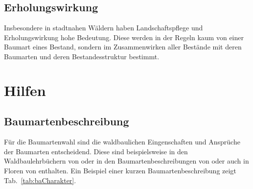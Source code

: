 \documentclass[twocolumn]{scrartcl}
\begin{document}
\subsection{Erholungswirkung}
\label{ssec:erholung}

Insbesondere in stadtnahen Wäldern haben Landschaftspflege und
Erholungswirkung hohe Bedeutung. Diese werden in der Regeln kaum von
einer Baumart eines Bestand, sondern im Zusammenwirken aller Bestände
mit deren Baumarten und deren Bestandesstruktur bestimmt.

\section{Hilfen}
\label{sec:hilfen}

\subsection{Baumartenbeschreibung}
\label{sec:baBeschreibung}

Für die Baumartenwahl sind die waldbaulichen Eingenschaften und
Ansprüche der Baumarten entscheidend. Diese sind beispielsweise in den
Waldbaulehrbüchern von
\citet{mayer1992Waldbau,burschel2003Waldbau,Dengler2020Waldbau,tschermak1950Waldbau,rittershofer2006Waldbau,rubner1960Waldbau,koestler1950Waldbau,bauer1962WaldbauAlsWissenschaft}
oder in den Baumartenbeschreibungen von
\citet{eth2002MitteleuropaeischeWaldbaumarten,leibundgut1984Waldbaeume,ec2016baumartenatlas,hieke1989Dendrologie,mayr1906FremdlaendischeWaldUndParkbaeumeFuerEuropa,stimm2014EnyklopedieDerHolzgewaechse,schuett1993LexikonDerForstbotanik,fva2021Artensteckbrief}
oder auch in Floren von
\citet{fischer2008Exkursionsflora,hegi1906IllustrierteFloraBd1,oberdorfer2001Exkursionsflora,rothmaler2021Exkursionsflora,schmeil2019Exkursionsflora,fitschen2017Gehoelzflora}
enthalten. Ein Beispiel einer kurzen Baumartenbeschreibung zeigt
Tab.~\ref{tab:baCharakter}.
\end{document}
